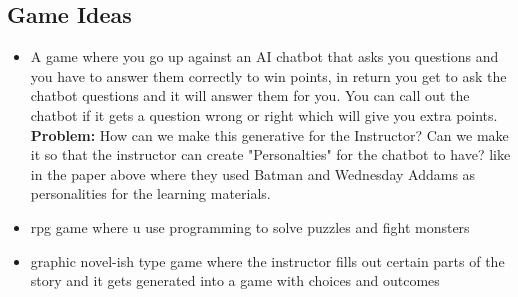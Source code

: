 \documentclass{article}
\begin{document}
\subsection{Game Ideas}
\begin{itemize}
    \item A game where you go up against an AI chatbot that asks you questions and you have to answer them correctly to win points, 
    in return you get to ask the chatbot questions and it will answer them for you. You can call out the chatbot if it gets a question wrong or right which will give you extra points. 
    \textbf{Problem:} How can we make this generative for the Instructor? Can we make it so that the instructor can create "Personalties" for the chatbot to have? 
    like in the paper above where they used Batman and Wednesday Addams as personalities for the learning materials.
    \item rpg game where u use programming to solve puzzles and fight monsters
    \item graphic novel-ish type game where the instructor fills out certain parts of the story and it gets generated into a game with choices and outcomes
\end{itemize}
\end{document}
